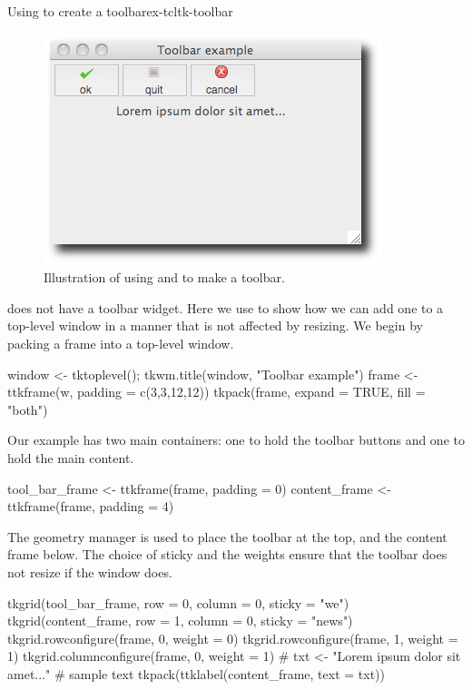 \begin{example}{Using  to create a toolbar}{ex-tcltk-toolbar}
%
\begin{figure}
  \centering
  \includegraphics[width=.6\textwidth]{fig-tcltk-toolbar.png}
  \caption{Illustration of using  and  to make a toolbar. }
  \label{fig:fig-tcltk-toolbar}
\end{figure}
\TK\/ does not have a toolbar widget. Here we use  to
show how we can add one to a top-level window in a manner that is not
affected by resizing. We begin by packing a frame into a
top-level window.
\begin{Schunk}
\begin{Sinput}
 window <- tktoplevel(); tkwm.title(window, "Toolbar example")
 frame <- ttkframe(w, padding = c(3,3,12,12))
 tkpack(frame, expand = TRUE, fill = "both")
\end{Sinput}
\end{Schunk}
Our example has two main containers: one to hold the toolbar buttons
and one to hold the main content.
\begin{Schunk}
\begin{Sinput}
 tool_bar_frame <- ttkframe(frame, padding = 0)
 content_frame <- ttkframe(frame, padding = 4)
\end{Sinput}
\end{Schunk}
The  geometry manager is used to place the toolbar at
the top, and the content frame below. The choice of sticky and the weights ensure that
the toolbar does not resize if the window does.
\begin{Schunk}
\begin{Sinput}
 tkgrid(tool_bar_frame, row = 0, column = 0, sticky = "we")
 tkgrid(content_frame, row = 1, column = 0, sticky  =  "news")
 tkgrid.rowconfigure(frame, 0, weight = 0)
 tkgrid.rowconfigure(frame, 1, weight = 1)
 tkgrid.columnconfigure(frame, 0, weight = 1)
 #
 txt <- "Lorem ipsum dolor sit amet..." # sample text
 tkpack(ttklabel(content_frame, text = txt))
\end{Sinput}
\end{Schunk}


\end{example}
